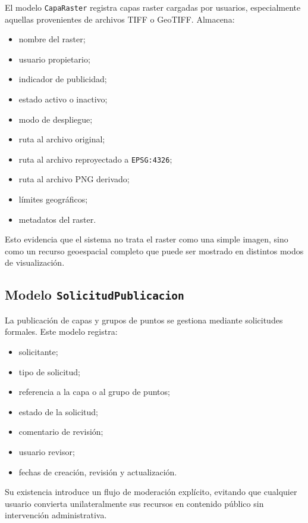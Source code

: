 \documentclass[12pt,a4paper]{report}
\begin{document}
El modelo \texttt{CapaRaster} registra capas raster cargadas por usuarios, especialmente aquellas provenientes de archivos TIFF o GeoTIFF. Almacena:

\begin{itemize}
    \item nombre del raster;
    \item usuario propietario;
    \item indicador de publicidad;
    \item estado activo o inactivo;
    \item modo de despliegue;
    \item ruta al archivo original;
    \item ruta al archivo reproyectado a \texttt{EPSG:4326};
    \item ruta al archivo PNG derivado;
    \item l\'imites geogr\'aficos;
    \item metadatos del raster.
\end{itemize}

Esto evidencia que el sistema no trata el raster como una simple imagen, sino como un recurso geoespacial completo que puede ser mostrado en distintos modos de visualizaci\'on.

\subsection{Modelo \texttt{SolicitudPublicacion}}

La publicaci\'on de capas y grupos de puntos se gestiona mediante solicitudes formales. Este modelo registra:

\begin{itemize}
    \item solicitante;
    \item tipo de solicitud;
    \item referencia a la capa o al grupo de puntos;
    \item estado de la solicitud;
    \item comentario de revisi\'on;
    \item usuario revisor;
    \item fechas de creaci\'on, revisi\'on y actualizaci\'on.
\end{itemize}

Su existencia introduce un flujo de moderaci\'on expl\'icito, evitando que cualquier usuario convierta unilateralmente sus recursos en contenido p\'ublico sin intervenci\'on administrativa.
\end{document}
